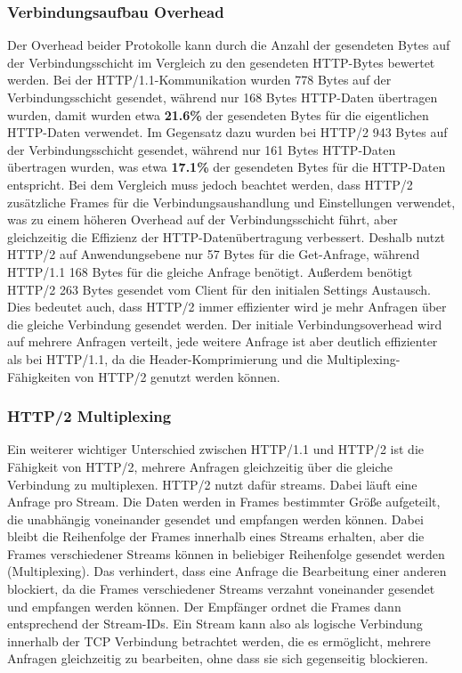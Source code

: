\subsubsection{Verbindungsaufbau Overhead}

Der Overhead beider Protokolle kann durch die Anzahl der gesendeten Bytes auf der Verbindungsschicht im Vergleich zu den gesendeten HTTP-Bytes bewertet werden.
Bei der HTTP/1.1-Kommunikation wurden 778 Bytes auf der Verbindungsschicht gesendet, während nur 168 Bytes HTTP-Daten übertragen wurden, damit wurden etwa \textbf{21.6\%} der gesendeten Bytes für die eigentlichen HTTP-Daten verwendet.
Im Gegensatz dazu wurden bei HTTP/2 943 Bytes auf der Verbindungsschicht gesendet, während nur 161 Bytes HTTP-Daten übertragen wurden, was etwa \textbf{17.1\%} der gesendeten Bytes für die HTTP-Daten entspricht.
Bei dem Vergleich muss jedoch beachtet werden, dass HTTP/2 zusätzliche Frames für die Verbindungsaushandlung und Einstellungen verwendet, was zu einem höheren Overhead auf der Verbindungsschicht führt, aber gleichzeitig die Effizienz der HTTP-Datenübertragung verbessert.
Deshalb nutzt HTTP/2 auf Anwendungsebene nur 57 Bytes für die Get-Anfrage, während HTTP/1.1 168 Bytes für die gleiche Anfrage benötigt.
Außerdem benötigt HTTP/2 263 Bytes gesendet vom Client für den initialen Settings Austausch.
Dies bedeutet auch, dass HTTP/2 immer effizienter wird je mehr Anfragen über die gleiche Verbindung gesendet werden.
Der initiale Verbindungsoverhead wird auf mehrere Anfragen verteilt, jede weitere Anfrage ist aber deutlich effizienter als bei HTTP/1.1, da die Header-Komprimierung und die Multiplexing-Fähigkeiten von HTTP/2 genutzt werden können.

\subsubsection{HTTP/2 Multiplexing}
Ein weiterer wichtiger Unterschied zwischen HTTP/1.1 und HTTP/2 ist die Fähigkeit von HTTP/2, mehrere Anfragen gleichzeitig über die gleiche Verbindung zu multiplexen.
HTTP/2 nutzt dafür streams.
Dabei läuft eine Anfrage pro Stream.
Die Daten werden in Frames bestimmter Größe aufgeteilt, die unabhängig voneinander gesendet und empfangen werden können.
Dabei bleibt die Reihenfolge der Frames innerhalb eines Streams erhalten, aber die Frames verschiedener Streams können in beliebiger Reihenfolge gesendet werden (Multiplexing).
Das verhindert, dass eine Anfrage die Bearbeitung einer anderen blockiert, da die Frames verschiedener Streams verzahnt voneinander gesendet und empfangen werden können.
Der Empfänger ordnet die Frames dann entsprechend der Stream-IDs.
Ein Stream kann also als logische Verbindung innerhalb der TCP Verbindung betrachtet werden, die es ermöglicht, mehrere Anfragen gleichzeitig zu bearbeiten, ohne dass sie sich gegenseitig blockieren.

